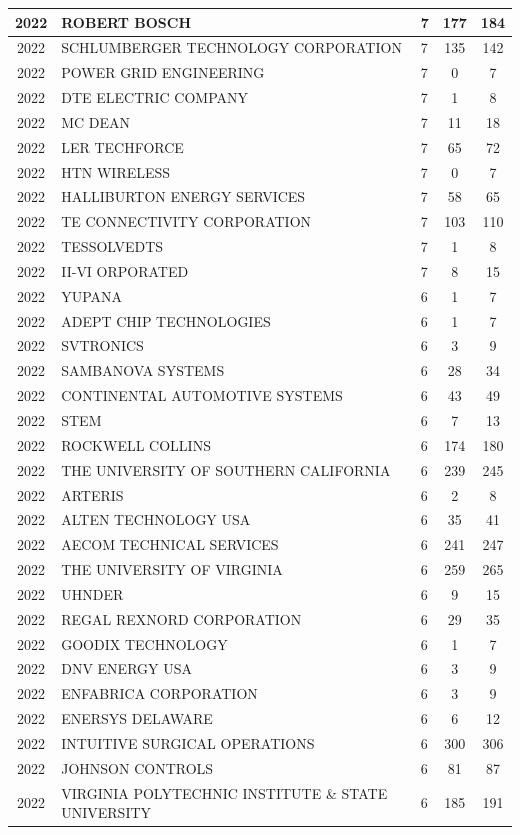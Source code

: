 \documentclass{article}%
\begin{document}
\begin{longtable}{c|p{20em}|p{5em}|c|c}
\hline%
2022&ROBERT BOSCH&7&177&184\\%
\hline%
2022&SCHLUMBERGER TECHNOLOGY CORPORATION&7&135&142\\%
\hline%
2022&POWER GRID ENGINEERING&7&0&7\\%
\hline%
2022&DTE ELECTRIC COMPANY&7&1&8\\%
\hline%
2022&MC DEAN&7&11&18\\%
\hline%
2022&LER TECHFORCE&7&65&72\\%
\hline%
2022&HTN WIRELESS&7&0&7\\%
\hline%
2022&HALLIBURTON ENERGY SERVICES&7&58&65\\%
\hline%
2022&TE CONNECTIVITY CORPORATION&7&103&110\\%
\hline%
2022&TESSOLVEDTS&7&1&8\\%
\hline%
2022&II{-}VI ORPORATED&7&8&15\\%
\hline%
2022&YUPANA&6&1&7\\%
\hline%
2022&ADEPT CHIP TECHNOLOGIES&6&1&7\\%
\hline%
2022&SVTRONICS&6&3&9\\%
\hline%
2022&SAMBANOVA SYSTEMS&6&28&34\\%
\hline%
2022&CONTINENTAL AUTOMOTIVE SYSTEMS&6&43&49\\%
\hline%
2022&STEM&6&7&13\\%
\hline%
2022&ROCKWELL COLLINS&6&174&180\\%
\hline%
2022&THE UNIVERSITY OF SOUTHERN CALIFORNIA&6&239&245\\%
\hline%
2022&ARTERIS&6&2&8\\%
\hline%
2022&ALTEN TECHNOLOGY USA&6&35&41\\%
\hline%
2022&AECOM TECHNICAL SERVICES&6&241&247\\%
\hline%
2022&THE UNIVERSITY OF VIRGINIA&6&259&265\\%
\hline%
2022&UHNDER&6&9&15\\%
\hline%
2022&REGAL REXNORD CORPORATION&6&29&35\\%
\hline%
2022&GOODIX TECHNOLOGY&6&1&7\\%
\hline%
2022&DNV ENERGY USA&6&3&9\\%
\hline%
2022&ENFABRICA CORPORATION&6&3&9\\%
\hline%
2022&ENERSYS DELAWARE&6&6&12\\%
\hline%
2022&INTUITIVE SURGICAL OPERATIONS&6&300&306\\%
\hline%
2022&JOHNSON CONTROLS&6&81&87\\%
\hline%
2022&VIRGINIA POLYTECHNIC INSTITUTE \& STATE UNIVERSITY&6&185&191\\%

\end{longtable}
\end{document}
